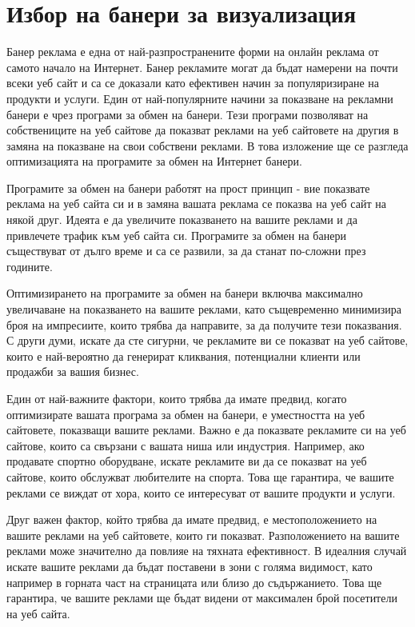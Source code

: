 \chapter{Избор на банери за визуализация}

Банер реклама е една от най-разпространените форми на онлайн реклама от самото начало на Интернет. Банер рекламите могат да бъдат намерени на почти всеки уеб сайт и са се доказали като ефективен начин за популяризиране на продукти и услуги. Един от най-популярните начини за показване на рекламни банери е чрез програми за обмен на банери. Тези програми позволяват на собствениците на уеб сайтове да показват реклами на уеб сайтовете на другия в замяна на показване на свои собствени реклами. В това изложение ще се разгледа оптимизацията на програмите за обмен на Интернет банери.

Програмите за обмен на банери работят на прост принцип - вие показвате реклама на уеб сайта си и в замяна вашата реклама се показва на уеб сайт на някой друг. Идеята е да увеличите показването на вашите реклами и да привлечете трафик към уеб сайта си. Програмите за обмен на банери съществуват от дълго време и са се развили, за да станат по-сложни през годините.

Оптимизирането на програмите за обмен на банери включва максимално увеличаване на показването на вашите реклами, като същевременно минимизира броя на импресиите, които трябва да направите, за да получите тези показвания. С други думи, искате да сте сигурни, че рекламите ви се показват на уеб сайтове, които е най-вероятно да генерират кликвания, потенциални клиенти или продажби за вашия бизнес.

Един от най-важните фактори, които трябва да имате предвид, когато оптимизирате вашата програма за обмен на банери, е уместността на уеб сайтовете, показващи вашите реклами. Важно е да показвате рекламите си на уеб сайтове, които са свързани с вашата ниша или индустрия. Например, ако продавате спортно оборудване, искате рекламите ви да се показват на уеб сайтове, които обслужват любителите на спорта. Това ще гарантира, че вашите реклами се виждат от хора, които се интересуват от вашите продукти и услуги.

Друг важен фактор, който трябва да имате предвид, е местоположението на вашите реклами на уеб сайтовете, които ги показват. Разположението на вашите реклами може значително да повлияе на тяхната ефективност. В идеалния случай искате вашите реклами да бъдат поставени в зони с голяма видимост, като например в горната част на страницата или близо до съдържанието. Това ще гарантира, че вашите реклами ще бъдат видени от максимален брой посетители на уеб сайта.

